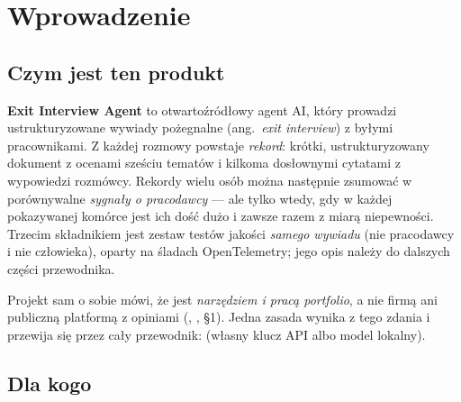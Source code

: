 
\section{Wprowadzenie}

\subsection{Czym jest ten produkt}

\textbf{Exit Interview Agent} to otwartoźródłowy agent AI, który prowadzi
ustrukturyzowane wywiady pożegnalne (ang.\ \emph{exit interview}) z byłymi
pracownikami. Z każdej rozmowy powstaje \emph{rekord}: krótki, ustrukturyzowany
dokument z ocenami sześciu tematów i kilkoma dosłownymi cytatami z wypowiedzi
rozmówcy. Rekordy wielu osób można następnie zsumować w porównywalne
\emph{sygnały o pracodawcy} --- ale tylko wtedy, gdy w każdej pokazywanej
komórce jest ich dość dużo i zawsze razem z miarą niepewności. Trzecim
składnikiem jest zestaw testów jakości \emph{samego wywiadu} (nie pracodawcy
i nie człowieka), oparty na śladach OpenTelemetry; jego opis należy do
dalszych części przewodnika.

Projekt sam o sobie mówi, że jest \emph{narzędziem i pracą portfolio},
a nie firmą ani publiczną platformą z opiniami (,
, §1). Jedna zasada wynika z tego
zdania i przewija się przez cały przewodnik:  (własny klucz API
albo model lokalny).

\subsection{Dla kogo}


